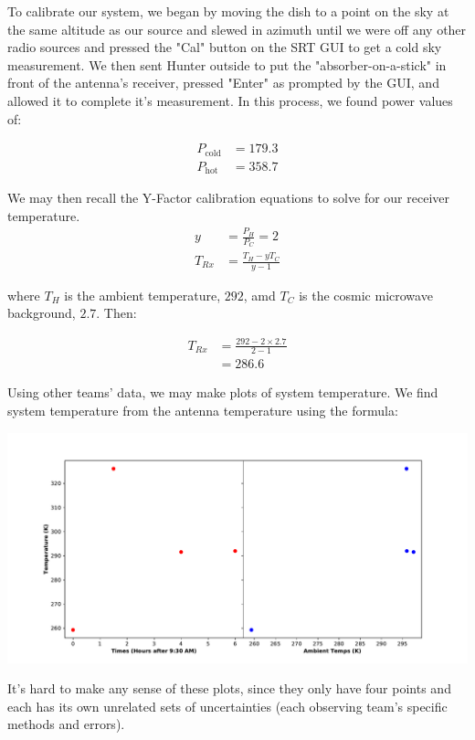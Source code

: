 \documentclass[12pt]{article}
\newenvironment{writeup}[2][Write-Up]{\begin{trivlist}
\item[\hskip \labelsep {\bfseries #1}\hskip \labelsep {\bfseries #2.}]}{\end{trivlist}}
\begin{document}
\begin{writeup}{1}

  To calibrate our system, we began by moving the dish to a point on the sky at the same altitude as our source and slewed in azimuth until we were off any other radio sources and pressed the "Cal" button on the SRT GUI to get a cold sky measurement. We then sent Hunter outside to put the "absorber-on-a-stick" in front of the antenna's receiver, pressed "Enter" as prompted by the GUI, and allowed it to complete it's measurement. In this process, we found power values of:

  \begin{align*}
    P_{\text{cold}} &= 179.3 \\
    P_{\text{hot}} &= 358.7
  \end{align*}

  We may then recall the Y-Factor calibration equations to solve for our receiver temperature.
  \begin{align*}
    y &= \frac{P_H}{P_C} = 2 \\
    T_{Rx} &= \frac{T_H - y T_C}{y - 1}
  \end{align*}

  where $T_H$ is the ambient temperature, $292$, amd $T_C$ is the cosmic microwave background, $2.7$. Then:

  \begin{align*}
    T_{Rx} &= \frac{292 - 2 \times 2.7}{2 - 1} \\
           &= 286.6
  \end{align*}


  Using other teams' data, we may make plots of system temperature. We find system temperature from the antenna temperature using the formula:

  \begin{center}
    \includegraphics[scale=0.6]{sys_temps.pdf} \\
  \end{center}

It's hard to make any sense of these plots, since they only have four points and each has its own unrelated sets of uncertainties (each observing team's specific methods and errors).

\end{writeup}
\bigskip
\bigskip
\end{document}
